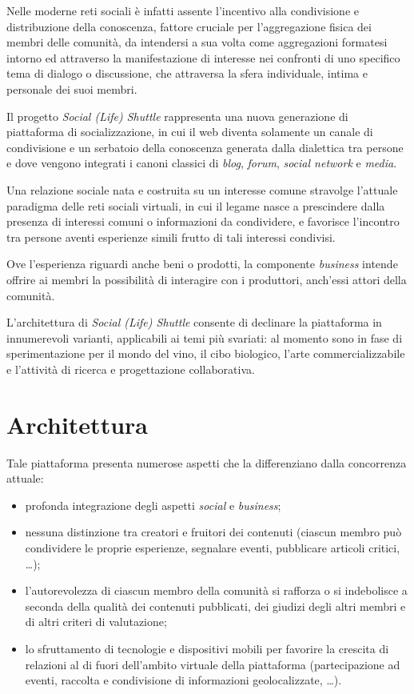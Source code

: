 Nelle moderne reti sociali è infatti assente l'incentivo alla condivisione e distribuzione della conoscenza, fattore cruciale per l'aggregazione fisica dei membri delle comunità, da intendersi a sua volta come aggregazioni formatesi intorno ed attraverso la manifestazione di interesse nei confronti di uno specifico tema di dialogo o discussione, che attraversa la sfera individuale, intima e personale dei suoi membri.

Il progetto \textit{Social (Life) Shuttle} rappresenta una nuova generazione di piattaforma di socializzazione, in cui il web diventa solamente un canale di condivisione e un serbatoio della conoscenza generata dalla dialettica tra persone e dove vengono integrati i canoni classici di \textit{blog}, \textit{forum}, \textit{social network} e \textit{media}.

Una relazione sociale nata e costruita su un interesse comune stravolge l'attuale paradigma delle reti sociali virtuali, in cui il legame nasce a prescindere dalla presenza di interessi comuni o informazioni da condividere, e favorisce l'incontro tra persone aventi esperienze simili frutto di tali interessi condivisi.

Ove l'esperienza riguardi anche beni o prodotti, la componente \textit{business} intende offrire ai membri la possibilità di interagire con i produttori, anch'essi attori della comunità.

L'architettura di \textit{Social (Life) Shuttle} consente di declinare la piattaforma in innumerevoli varianti, applicabili ai temi più svariati: al momento sono in fase di sperimentazione per il mondo del vino, il cibo biologico, l'arte commercializzabile e l'attività di ricerca e progettazione collaborativa. 

\section{Architettura}
\label{sec:tesi:progetto:architettura}
Tale piattaforma presenta numerose aspetti che la differenziano dalla concorrenza attuale:
\begin{itemize}
	\item profonda integrazione degli aspetti \textit{social} e \textit{business};
	\item nessuna distinzione tra creatori e fruitori dei contenuti (ciascun membro può condividere le proprie esperienze, segnalare eventi, pubblicare articoli critici, \ldots);
	\item l'autorevolezza di ciascun membro della comunità si rafforza o si indebolisce a seconda della qualità dei contenuti pubblicati, dei giudizi degli altri membri e di altri criteri di valutazione;
	\item lo sfruttamento di tecnologie e dispositivi mobili per favorire la crescita di relazioni al di fuori dell'ambito virtuale della piattaforma (partecipazione ad eventi, raccolta e condivisione di informazioni geolocalizzate, \ldots).
\end{itemize}

